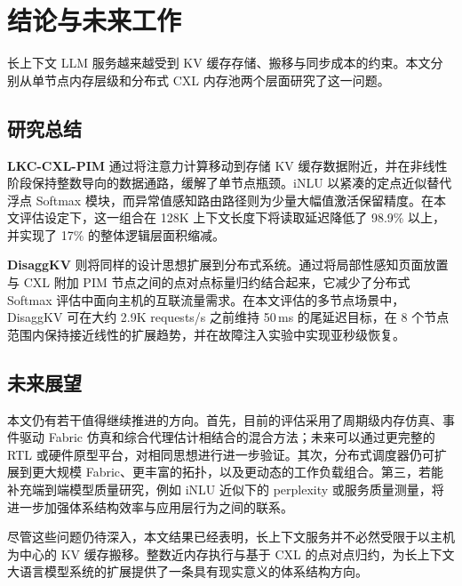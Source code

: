 \chapter{结论与未来工作}
\label{ch:conclusion}

长上下文 LLM 服务越来越受到 KV 缓存存储、搬移与同步成本的约束。本文分别从单节点内存层级和分布式 CXL 内存池两个层面研究了这一问题。

\section{研究总结}

\textbf{LKC-CXL-PIM} 通过将注意力计算移动到存储 KV 缓存数据附近，并在非线性阶段保持整数导向的数据通路，缓解了单节点瓶颈。iNLU 以紧凑的定点近似替代浮点 Softmax 模块，而异常值感知路由路径则为少量大幅值激活保留精度。在本文评估设定下，这一组合在 128K 上下文长度下将读取延迟降低了 98.9\% 以上，并实现了 17\% 的整体逻辑层面积缩减。

\textbf{DisaggKV} 则将同样的设计思想扩展到分布式系统。通过将局部性感知页面放置与 CXL 附加 PIM 节点之间的点对点标量归约结合起来，它减少了分布式 Softmax 评估中面向主机的互联流量需求。在本文评估的多节点场景中，DisaggKV 可在大约 2.9K requests/s 之前维持 50\,ms 的尾延迟目标，在 8 个节点范围内保持接近线性的扩展趋势，并在故障注入实验中实现亚秒级恢复。

\section{未来展望}

本文仍有若干值得继续推进的方向。首先，目前的评估采用了周期级内存仿真、事件驱动 Fabric 仿真和综合代理估计相结合的混合方法；未来可以通过更完整的 RTL 或硬件原型平台，对相同思想进行进一步验证。其次，分布式调度器仍可扩展到更大规模 Fabric、更丰富的拓扑，以及更动态的工作负载组合。第三，若能补充端到端模型质量研究，例如 iNLU 近似下的 perplexity 或服务质量测量，将进一步加强体系结构效率与应用层行为之间的联系。

尽管这些问题仍待深入，本文结果已经表明，长上下文服务并不必然受限于以主机为中心的 KV 缓存搬移。整数近内存执行与基于 CXL 的点对点归约，为长上下文大语言模型系统的扩展提供了一条具有现实意义的体系结构方向。

